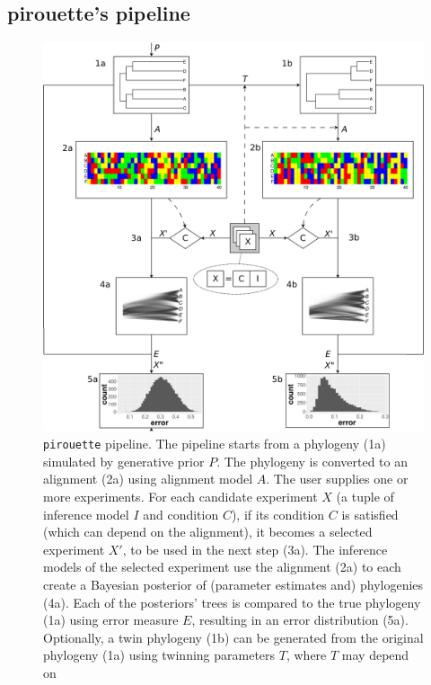 \documentclass{article}
\begin{document}
\subsection{pirouette's pipeline}

\begin{figure}
  \centering
  \includegraphics[width=\textwidth]{workflow.png}
  \caption{
    \texttt{pirouette} pipeline. 
    The pipeline starts from a phylogeny (1a) simulated by generative prior 
$\mathit{P}$.
    The phylogeny is converted to an alignment (2a) using alignment model 
$\mathit{A}$. 
    The user supplies one or more experiments.
    For each candidate experiment $\mathit{X}$ 
    (a tuple of inference model $\mathit{I}$ and condition $\mathit{C}$),
    if its condition $\mathit{C}$ is 
    satisfied (which can depend on the alignment), 
    it becomes a selected experiment $\mathit{X'}$, 
    to be used in the next step (3a).
    The inference models of the selected experiment use the alignment (2a) 
    to each create a Bayesian posterior of (parameter estimates and) 
    phylogenies (4a). 
    Each of the posteriors' trees is compared to the true phylogeny (1a) 
    using error measure $\mathit{E}$, 
    resulting in an error distribution (5a). 
    Optionally, a twin phylogeny (1b) can be generated from the original 
    phylogeny (1a) using twinning parameters $T$, where $T$ may depend on
}
\end{figure}
\end{document}
